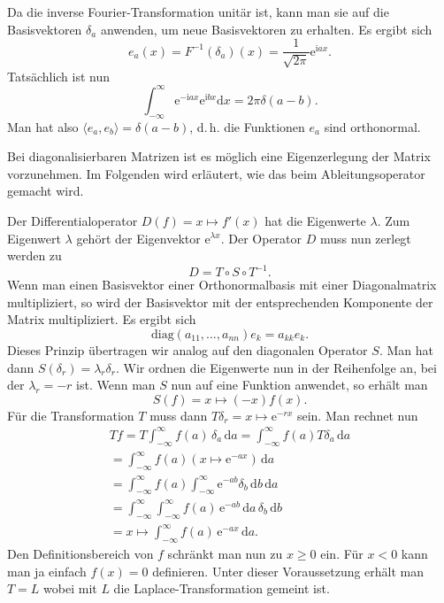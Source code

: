 \documentclass[a4paper,11pt,fleqn,twocolumn,twoside]{scrartcl}
\numberwithin{equation}{section}
\newcommand{\ui}{\mathrm i}
\newcommand{\ee}{\mathrm e}
\begin{document}
Da die inverse Fourier-Transformation unitär ist, kann man sie auf
die Basisvektoren $\delta_a$ anwenden, um neue Basisvektoren zu
erhalten. Es ergibt sich
\begin{equation}
e_a(x) = F^{-1}(\delta_a)(x) = \frac{1}{\sqrt{2\pi}}\ee^{\ui ax}.
\end{equation}
Tatsächlich ist nun
\begin{equation}
\int_{-\infty}^{\infty} \ee^{-\ui ax}\ee^{\ui bx}\mathrm dx
= 2\pi\delta(a-b).
\end{equation}
Man hat also $\langle e_a,e_b\rangle = \delta(a-b)$, d.\,h. die
Funktionen $e_a$ sind orthonormal.

Bei diagonalisierbaren Matrizen ist es möglich eine Eigenzerlegung
der Matrix vorzunehmen. Im Folgenden wird erläutert, wie das beim
Ableitungsoperator gemacht wird.

Der Differentialoperator $D(f)=x\mapsto f'(x)$ hat die
Eigenwerte $\lambda$. Zum Eigenwert $\lambda$ gehört der
Eigenvektor $\ee^{\lambda x}$. Der Operator $D$ muss nun zerlegt
werden zu%
\begin{equation}
D=T\circ S\circ T^{-1}.
\end{equation}
Wenn man einen Basisvektor einer Orthonormalbasis mit einer
Diagonalmatrix multipliziert, so wird der Basisvektor mit der
entsprechenden Komponente der Matrix multipliziert. Es ergibt sich
\begin{equation}
\mathrm{diag}(a_{11},\ldots,a_{nn})e_k = a_{kk}e_k.
\end{equation}
Dieses Prinzip übertragen wir analog auf den diagonalen
Operator $S$. Man hat dann $S(\delta_r) = \lambda_r \delta_r$.
Wir ordnen die Eigenwerte nun in der Reihenfolge an, bei der
$\lambda_r=-r$ ist. Wenn man $S$ nun auf eine Funktion anwendet,
so erhält man
\begin{equation}
S(f) = x\mapsto (-x)f(x).
\end{equation}
Für die Transformation $T$ muss dann
$T\delta_r = x\mapsto \ee^{-rx}$ sein.
Man rechnet nun
\begin{gather*}
Tf = T\int_{-\infty}^{\infty} f(a)\,\delta_a\,\mathrm da
= \int_{-\infty}^{\infty} f(a)T\delta_a\,\mathrm da\\
= \int_{-\infty}^{\infty} f(a)(x\mapsto \ee^{-ax})\,\mathrm da\\
= \int_{-\infty}^{\infty} f(a)\int_{-\infty}^{\infty} \ee^{-ab}\delta_b
\,\mathrm db\,\mathrm da\\
= \int_{-\infty}^{\infty}\int_{-\infty}^{\infty} f(a)\,\ee^{-ab}
\,\mathrm da\,\delta_b\,\mathrm db\\
= x\mapsto \int_{-\infty}^{\infty} f(a)\,\ee^{-ax}\,\mathrm da.
\end{gather*}
Den Definitionsbereich von $f$ schränkt man nun zu $x\ge 0$ ein.
Für $x<0$ kann man ja einfach $f(x)=0$ definieren. Unter dieser
Voraussetzung erhält man $T=L$ wobei mit $L$ die
Laplace-Transformation gemeint ist.
\end{document}
